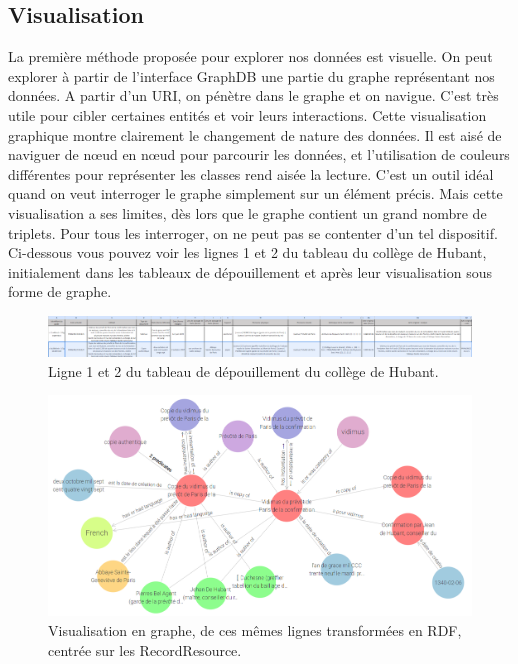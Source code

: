 \subsection{Visualisation}
La première méthode proposée pour explorer nos données est visuelle. On peut explorer à partir de l'interface GraphDB une partie du graphe représentant nos données. A partir d'un URI, on pénètre dans le graphe et on navigue. C'est très utile pour cibler certaines entités et voir leurs interactions. Cette visualisation graphique montre clairement le changement de nature des données. Il est aisé de naviguer de nœud en nœud pour parcourir les données, et l'utilisation de couleurs différentes pour représenter les classes rend aisée la lecture. C'est un outil idéal quand on veut interroger le graphe simplement sur un élément précis. Mais cette visualisation a ses limites, dès lors que le graphe contient un grand nombre de triplets. Pour tous les interroger, on ne peut pas se contenter d'un tel dispositif. Ci-dessous vous pouvez voir les lignes 1 et 2 du tableau du collège de Hubant, initialement dans les tableaux de dépouillement et après leur visualisation sous forme de graphe.
\begin{figure}[!h]
    \centering
    \includegraphics[width=1.14\linewidth]{images/ligne tableau.png}
    \caption{Ligne 1 et 2 du tableau de dépouillement du collège de Hubant.}
    \label{fig:tableau-depouillement-hubant}
\end{figure}
\begin{figure}[!h]
    \centering
    \includegraphics[width=0.9\linewidth]{images/visiualisation graphe hubant.png}
    \caption{Visualisation en graphe, de ces mêmes lignes transformées en RDF, centrée sur les RecordResource.}
    \label{fig:graphe-hubant}
\end{figure}
